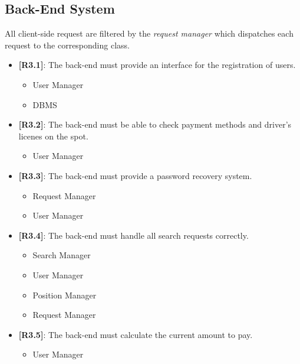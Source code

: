 \subsection{Back-End System}
All client-side request are filtered by the \emph{request manager} which dispatches each request to the corresponding class.\\
\begin{itemize}
	\item {\textbf{[R3.1]}}: The back-end must provide an interface for the registration of users.
	\begin{itemize}
	\item User Manager
	\item DBMS\\
	\end{itemize}

	\item {\textbf{[R3.2]}}: The back-end must be able to check payment methods and driver’s licenes on the spot.
	\begin{itemize}
	\item User Manager\\
	\end{itemize}
	
	\item {\textbf{[R3.3]}}: The back-end must provide a password 			recovery system.
	\begin{itemize}
	\item Request Manager
	\item User Manager\\
	\end{itemize}
	
	\item {\textbf{[R3.4]}}: The back-end must handle all search requests correctly.
	\begin{itemize}
	\item Search Manager
	\item User Manager
	\item Position Manager
	\item Request Manager
	\end{itemize}
	
	\item {\textbf{[R3.5]}}: The back-end must calculate the current amount to pay.
	\begin{itemize}
	\item User Manager\\
	\end{itemize}
	

\end{itemize}
